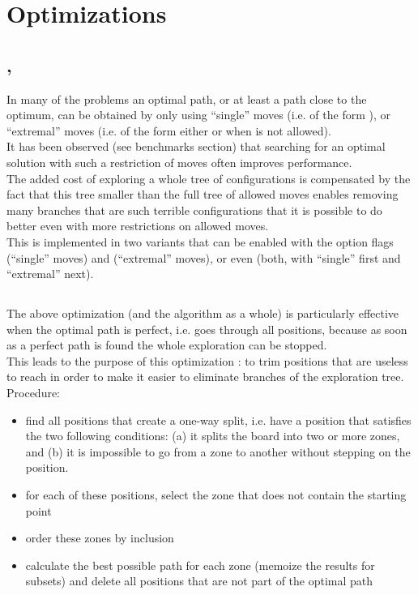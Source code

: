 \section{Optimizations}


\subsection{, }

In many of the problems an optimal path, or at least a path close to the optimum,
can be obtained by only using ``single'' moves (i.e. of the form ),
or ``extremal'' moves (i.e. of the form either  or  when
 is not allowed).\\

It has been observed (see benchmarks section) that searching for an optimal
solution with such a restriction of moves often improves performance.\\
The added cost of exploring a whole tree of configurations is compensated
by the fact that this tree smaller than the full tree of allowed moves
enables removing many branches that are such terrible configurations
that it is possible to do better even with more restrictions on allowed moves.\\

This is implemented in two variants that can be enabled with the option flags
 (``single'' moves) and  (``extremal'' moves), or even
 (both, with ``single'' first and ``extremal'' next).\\


\subsection{}

The above optimization (and the algorithm as a whole) is particularly effective
when the optimal path is perfect, i.e. goes through all positions, because
as soon as a perfect path is found the whole exploration can be stopped.\\
This leads to the purpose of this optimization : to trim positions that
are useless to reach in order to make it easier to eliminate branches of the
exploration tree.\\

Procedure:
\begin{itemize}
    \item find all positions that create a one-way split, i.e. have a position
    that satisfies the two following conditions: (a) it splits the board into
    two or more zones, and (b) it is impossible to go from a zone to another
    without stepping on the position.
    \item for each of these positions, select the zone that does not
    contain the starting point
    \item order these zones by inclusion
    \item calculate the best possible path for each zone (memoize the results
    for subsets) and delete all positions that are not part of the optimal path
\end{itemize}~\\

